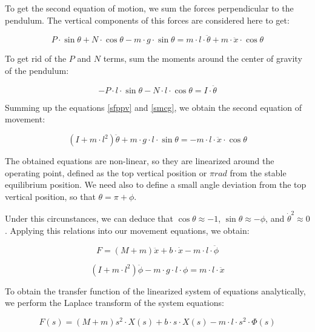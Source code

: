 \documentclass{article}
\begin{document}
To get the second equation of motion, we sum the forces perpendicular to the pendulum. The vertical components of this forces are considered here to get:

\begin{equation} \label{sfppv}
	P\cdot \sin{\theta}+N\cdot \cos{\theta}-m\cdot g\cdot \sin{\theta}=m\cdot l\cdot \ddot{\theta}+m\cdot \ddot{x}\cdot \cos{\theta}
\end{equation}

To get rid of the $P$ and $N$ terms, sum the moments around the center of gravity of the pendulum:

\begin{equation} \label{smcg}
	-P\cdot l\cdot \sin{\theta}-N\cdot l\cdot \cos{\theta}=I\cdot \ddot{\theta}
\end{equation}

Summing up the equations \ref{sfppv} and \ref{smcg}, we obtain the second equation of movement:

\begin{equation} \label{sem}
	(I+m\cdot l^2)\ddot{\theta}+m\cdot g\cdot l\cdot \sin{\theta}=-m\cdot l\cdot \ddot{x}\cdot \cos{\theta}
\end{equation}

The obtained equations are non-linear, so they are linearized around the operating point, defined as the top vertical position or $\pi rad$ from the stable equilibrium position. We need also to define a small angle deviation from the top vertical position, so that $\theta=\pi+\phi$.

Under this circunstances, we can deduce that $\cos{\theta}\approx -1$, $\sin{\theta}\approx -\phi$, and $\dot{\theta}^2\approx 0$. Applying this relations into our movement equations, we obtain:

\begin{equation} \label{feml}
	F=(M+m)\ddot{x}+b\cdot \dot{x}-m\cdot l\cdot \ddot{\phi}
\end{equation}

\begin{equation} \label{seml}
	(I+m\cdot l^2)\ddot{\phi}-m\cdot g\cdot l\cdot \phi=m\cdot l\cdot \ddot{x}
\end{equation}

To obtain the transfer function of the linearized system of equations analytically, we perform the Laplace transform of the system equations:

\begin{equation} \label{fems}
	F(s)=(M+m)s^2\cdot X(s)+b\cdot s\cdot X(s)-m\cdot l\cdot s^2\cdot \Phi(s)
\end{equation}
\end{document}
